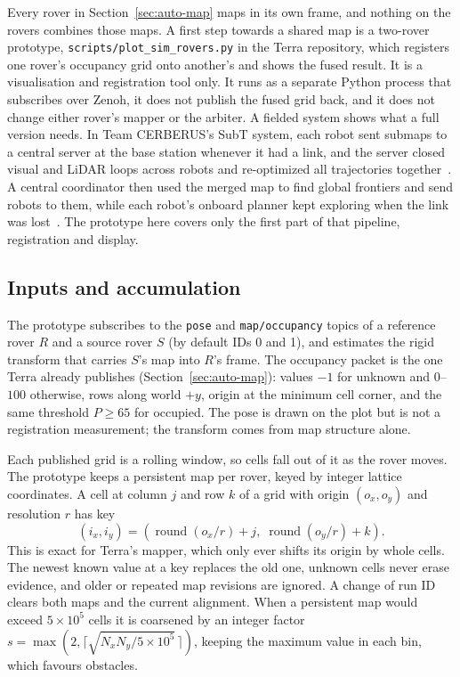 Every rover in Section~\ref{sec:auto-map} maps in its own frame, and nothing on the rovers combines those maps.
A first step towards a shared map is a two-rover prototype, \texttt{scripts/plot\_sim\_rovers.py} in the Terra repository, which registers one rover's occupancy grid onto another's and shows the fused result.
It is a visualisation and registration tool only.
It runs as a separate Python process that subscribes over Zenoh, it does not publish the fused grid back, and it does not change either rover's mapper or the arbiter.
A fielded system shows what a full version needs.
In Team CERBERUS's SubT system, each robot sent submaps to a central server at the base station whenever it had a link, and the server closed visual and LiDAR loops across robots and re-optimized all trajectories together~\citep{tranzatto2022finals}.
A central coordinator then used the merged map to find global frontiers and send robots to them, while each robot's onboard planner kept exploring when the link was lost~\citep{kulkarni2022teamed}.
The prototype here covers only the first part of that pipeline, registration and display.

\subsection{Inputs and accumulation}

The prototype subscribes to the \texttt{pose} and \texttt{map/occupancy} topics of a reference rover $R$ and a source rover $S$ (by default IDs 0 and 1), and estimates the rigid transform that carries $S$'s map into $R$'s frame.
The occupancy packet is the one Terra already publishes (Section~\ref{sec:auto-map}): values $-1$ for unknown and $0$--$100$ otherwise, rows along world $+y$, origin at the minimum cell corner, and the same threshold $P \ge 65$ for occupied.
The pose is drawn on the plot but is not a registration measurement; the transform comes from map structure alone.

Each published grid is a rolling window, so cells fall out of it as the rover moves.
The prototype keeps a persistent map per rover, keyed by integer lattice coordinates.
A cell at column $j$ and row $k$ of a grid with origin $(o_x, o_y)$ and resolution $r$ has key
\begin{equation}
  (i_x, i_y) = \left(\operatorname{round}(o_x / r) + j,\; \operatorname{round}(o_y / r) + k\right).
\end{equation}
This is exact for Terra's mapper, which only ever shifts its origin by whole cells.
The newest known value at a key replaces the old one, unknown cells never erase evidence, and older or repeated map revisions are ignored.
A change of run ID clears both maps and the current alignment.
When a persistent map would exceed $5 \times 10^5$ cells it is coarsened by an integer factor $s = \max(2, \lceil\sqrt{N_x N_y / 5 \times 10^5}\,\rceil)$, keeping the maximum value in each bin, which favours obstacles.

